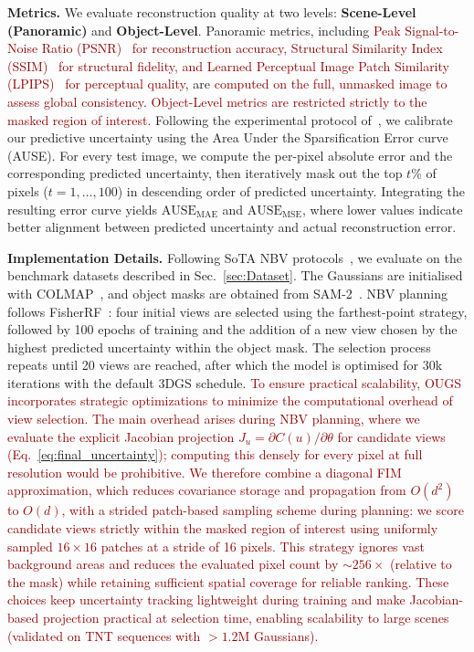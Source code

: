 \documentclass{egpubl}
\newcommand{\pname}[1]{{OUGS}}
\newcommand{\rev}[1]{\textcolor{darkred}{#1}}
\begin{document}
\noindent\textbf{Metrics.} We evaluate reconstruction quality at two levels: \textbf{Scene-Level (Panoramic)} and \textbf{Object-Level}. Panoramic metrics, including \rev{Peak Signal-to-Noise Ratio (PSNR)~\cite{PSNR} for reconstruction accuracy, Structural Similarity Index (SSIM)~\cite{SSIM} for structural fidelity, and Learned Perceptual Image Patch Similarity (LPIPS)~\cite{LPIPS} for perceptual quality}, are \rev{computed on the full, unmasked image to assess global consistency}. \rev{Object-Level metrics are restricted strictly to the masked region of interest.} 
Following the experimental protocol of~\cite{goli2023}, we calibrate our predictive uncertainty using the Area Under the Sparsification Error curve (AUSE). For every test image, we compute the per-pixel absolute error and the corresponding predicted uncertainty, then iteratively mask out the top $t\%$ of pixels ($t = 1,\dots,100$) in descending order of predicted uncertainty. Integrating the resulting error curve yields $\text{AUSE}_{\text{MAE}}$ and $\text{AUSE}_{\text{MSE}}$, where lower values indicate better alignment between predicted uncertainty and actual reconstruction error.

\noindent\textbf{Implementation Details.}
Following SoTA NBV protocols~\cite{wilsonPOpGSNextBest2025a}, we evaluate on the benchmark datasets described in Sec.~\ref{sec:Dataset}. The Gaussians are initialised with COLMAP~\cite{Schonberger_2016_CVPR}, and object masks are obtained from SAM-2~\cite{ravi2024sam2segmentimages}. NBV planning follows FisherRF~\cite{jiangFisherRFActiveView2024}: four initial views are selected using the farthest-point strategy, followed by 100 epochs of training and the
addition of a new view chosen by the highest predicted uncertainty
within the object mask. The selection process repeats until 20 views are reached, after which the model is optimised for 30k iterations with the default 3DGS schedule.
\rev{To ensure practical scalability, \pname{} incorporates strategic optimizations to minimize the computational overhead of view selection. 
The main overhead arises during NBV planning, where we evaluate the explicit Jacobian projection $J_u=\partial C(u)/\partial\theta$ for candidate views (Eq.~\ref{eq:final_uncertainty}); computing this densely for every pixel at full resolution would be prohibitive. We therefore combine a diagonal FIM approximation, which reduces covariance storage and propagation from $O(d^2)$ to $O(d)$, with a strided patch-based sampling scheme during planning: we score candidate views strictly within the masked region of interest using uniformly sampled $16{\times}16$ patches at a stride of 16 pixels. This strategy ignores vast background areas and reduces the evaluated pixel count by $\sim256\times$ (relative to the mask) while retaining sufficient spatial coverage for reliable ranking. These choices keep uncertainty tracking lightweight during training and make Jacobian-based projection practical at selection time, enabling scalability to large scenes (validated on TNT sequences with $>1.2$M Gaussians).}
\vspace{-3mm}
\end{document}
